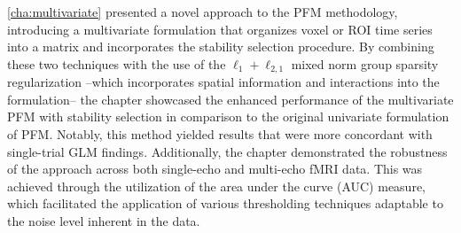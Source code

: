 \cref{cha:multivariate} presented a novel approach to the PFM methodology,
introducing a multivariate formulation that organizes voxel or ROI
time series into a matrix and incorporates the stability selection procedure. By
combining these two techniques with the use of the $\ell_1 + \ell_{2,1}$ mixed
norm group sparsity regularization --which incorporates spatial information and
interactions into the formulation-- the chapter showcased the enhanced
performance of the multivariate PFM with stability selection in comparison to
the original univariate formulation of PFM. Notably, this method yielded results
that were more concordant with single-trial GLM findings. Additionally, the
chapter demonstrated the robustness of the approach across both single-echo and
multi-echo fMRI data. This was achieved through the utilization of the area
under the curve (AUC) measure, which facilitated the application of various
thresholding techniques adaptable to the noise level inherent in the data.

